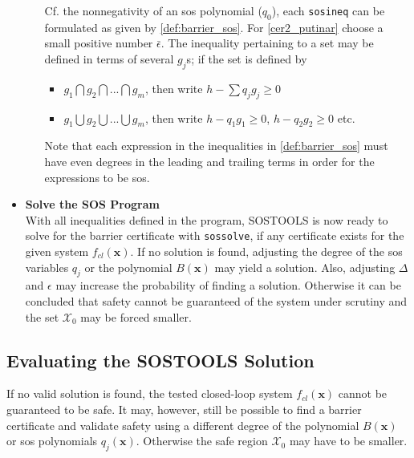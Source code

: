 \begin{itemize}
\begin{itemize}
		Cf. the nonnegativity of an \gls{sos} polynomial ($q_0$), each \texttt{sosineq} can be formulated as given by  \autoref{def:barrier_sos}. For \autoref{cer2_putinar} choose a small positive number $\bar{\epsilon}$. The inequality pertaining to a set may be defined in terms of several $g_j$s; if the set is defined by
		\begin{itemize}
			\item $g_1 \bigcap g_2 \bigcap ... \bigcap g_m$, then write $h - \sum q_jg_j\geq 0$
			\item $g_1 \bigcup g_2 \bigcup ... \bigcup g_m$, then write $h - q_1g_1\geq 0$, $h - q_2g_2\geq 0$ etc.
		\end{itemize} 
		Note that each expression in the inequalities in \autoref{def:barrier_sos} must have even degrees in the leading and trailing terms in order for the expressions to be \gls{sos}.
	\end{itemize}
	\item \textbf{Solve the SOS Program}\\
	With all inequalities defined in the program, SOSTOOLS is now ready to solve for the barrier certificate with \texttt{sossolve}, if any certificate exists for the given system $f_{cl}(\mathbf{x})$. If no solution is found, adjusting the degree of the \gls{sos} variables $q_j$ or the polynomial $B(\mathbf{x})$ may yield a solution. Also, adjusting $\Delta$ and $\epsilon$ may increase the probability of finding a solution. Otherwise it can be concluded that safety cannot be guaranteed of the system under scrutiny and the set $\mathcal{X}_0$ may be forced smaller. 
\end{itemize}









\subsection{Evaluating the SOSTOOLS Solution}\label{subsec:eval_sos}
If no valid solution is found, the tested closed-loop system $f_{cl}(\mathbf{x})$ cannot be guaranteed to be safe. It may, however, still be possible to find a barrier certificate and validate safety using a different degree of the polynomial $B(\mathbf{x})$ or \gls{sos} polynomials $q_j(\mathbf{x})$. Otherwise the safe region $\mathcal{X}_0$ may have to be smaller.

